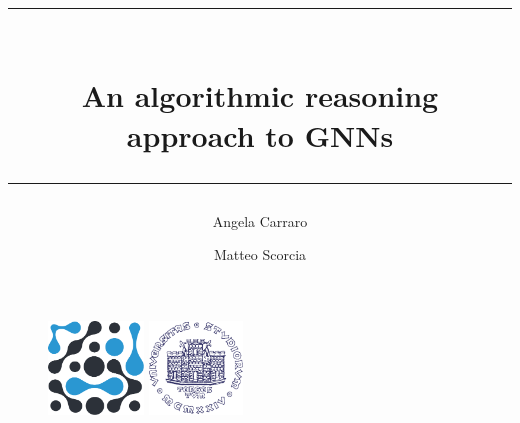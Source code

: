 \documentclass[10pt, onecolumn]{article}
\title{\rule{\textwidth}{0.4pt}\\\huge{An algorithmic reasoning\\approach to GNNs}\\\rule{\textwidth}{0.4pt}}
\author{\Large{Angela Carraro}}
\author{\Large{Matteo Scorcia}}
\affil{\Large{DSSC + IN20 - UniTS}}
\date{}
\begin{document}
\maketitle

\begin{figure}
    \centering
    \includegraphics[height=2.5cm]{figures/logo_dssc_alt.pdf}
    \hspace*{1cm}
    \includegraphics[height=2.5cm]{figures/Logo_units_blu.pdf}
\end{figure}

\thispagestyle{empty} %
\newpage

\tableofcontents

\newpage








\printindex

\nocite{*}

\end{document}
